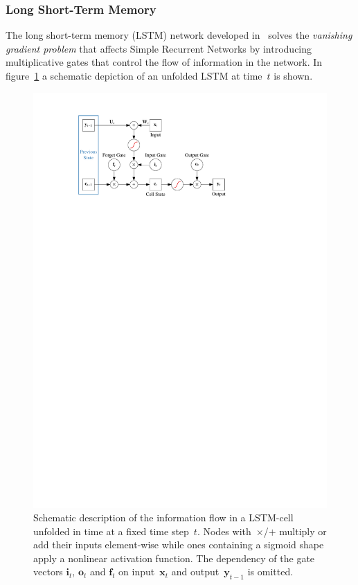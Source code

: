 \subsubsection{Long Short-Term Memory}
\label{sec:lstm}
The long short-term memory (LSTM) network developed in~\cite{lstm} solves the
\emph{vanishing gradient problem} that affects Simple Recurrent Networks by
introducing multiplicative gates that control the flow of information in the
network. In figure~\ref{fig:schematic_lstm} a schematic depiction of an unfolded
LSTM at time~$t$ is shown.
\begin{figure}[htb]
  \centering
  \includegraphics{./figures/theory/LSTM.pdf}
  \caption{Schematic description of the information flow in a LSTM-cell unfolded
    in time at a fixed time step~$t$. Nodes with~$\times$/$+$ multiply or add
    their inputs element-wise while ones containing a sigmoid shape apply a
    nonlinear activation function. The dependency of the gate vectors
    $\mathbf{i}_t$, $\mathbf{o}_t$ and $\mathbf{f}_t$ on input~$\mathbf{x}_t$
    and output~$\mathbf{y}_{t-1}$ is omitted.}
  \label{fig:schematic_lstm}
\end{figure}
